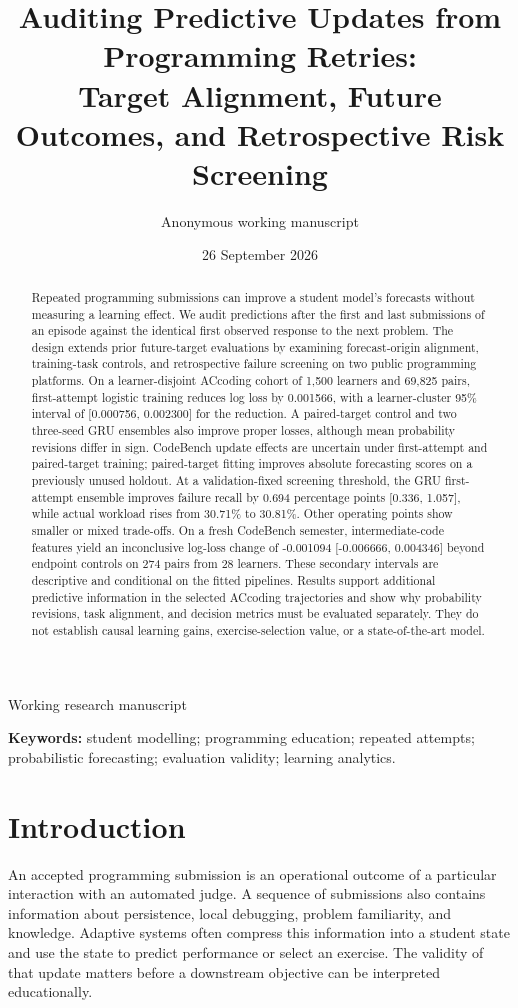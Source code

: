 \documentclass[11pt]{article}
\title{Auditing Predictive Updates from Programming Retries:\\Target Alignment, Future Outcomes, and Retrospective Risk Screening}
\author{Anonymous working manuscript}
\date{26 September 2026}
\newcommand{\1}{\mathbb{I}}
\begin{document}
\maketitle
\begin{center}\small Working research manuscript\end{center}
\begin{abstract}
Repeated programming submissions can improve a student model's forecasts without measuring a learning effect. We audit predictions after the first and last submissions of an episode against the identical first observed response to the next problem. The design extends prior future-target evaluations by examining forecast-origin alignment, training-task controls, and retrospective failure screening on two public programming platforms. On a learner-disjoint ACcoding cohort of 1,500 learners and 69,825 pairs, first-attempt logistic training reduces log loss by 0.001566, with a learner-cluster 95\% interval of [0.000756, 0.002300] for the reduction. A paired-target control and two three-seed GRU ensembles also improve proper losses, although mean probability revisions differ in sign. CodeBench update effects are uncertain under first-attempt and paired-target training; paired-target fitting improves absolute forecasting scores on a previously unused holdout. At a validation-fixed screening threshold, the GRU first-attempt ensemble improves failure recall by 0.694 percentage points [0.336, 1.057], while actual workload rises from 30.71\% to 30.81\%. Other operating points show smaller or mixed trade-offs. On a fresh CodeBench semester, intermediate-code features yield an inconclusive log-loss change of -0.001094 [-0.006666, 0.004346] beyond endpoint controls on 274 pairs from 28 learners. These secondary intervals are descriptive and conditional on the fitted pipelines. Results support additional predictive information in the selected ACcoding trajectories and show why probability revisions, task alignment, and decision metrics must be evaluated separately. They do not establish causal learning gains, exercise-selection value, or a state-of-the-art model.
\end{abstract}
\noindent\textbf{Keywords:} student modelling; programming education; repeated attempts; probabilistic forecasting; evaluation validity; learning analytics.

\section{Introduction}
An accepted programming submission is an operational outcome of a particular interaction with an automated judge. A sequence of submissions also contains information about persistence, local debugging, problem familiarity, and knowledge. Adaptive systems often compress this information into a student state and use the state to predict performance or select an exercise. The validity of that update matters before a downstream objective can be interpreted educationally.
\end{document}
